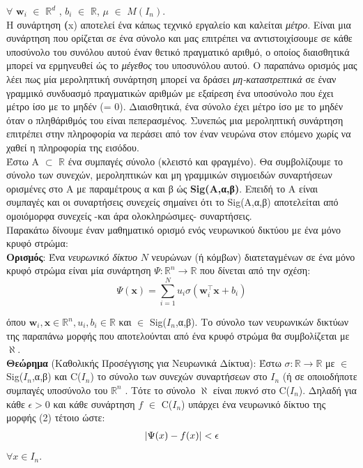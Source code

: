 \documentclass[11pt]{article} %
\numberwithin{equation}{subsection}
\begin{document}
$\forall$ $\textbf{w}_i$ $\in$   $\mathbb{R}^d$ , $b_i$ $\in$ $\mathbb{R}$, $\mu$ $\in$ $M(I_n)$.\\

Η συνάρτηση \mu \textbf(x) αποτελεί ένα κάπως τεχνικό εργαλείο και καλείται \textit{μέτρο}. Είναι μια συνάρτηση που ορίζεται σε ένα σύνολο και μας επιτρέπει να αντιστοιχίσουμε σε κάθε υποσύνολο του συνόλου αυτού έναν θετικό πραγματικό αριθμό, ο οποίος διαισθητικά μπορεί να ερμηνευθεί ώς το \textit{μέγεθος} του υποσυνόλου αυτού. Ο παραπάνω ορισμός μας λέει πως μία μεροληπτική συνάρτηση μπορεί να δράσει \textit{μη-καταστρεπτικά} σε έναν γραμμικό συνδυασμό πραγματικών αριθμών με εξαίρεση ένα υποσύνολο που έχει μέτρο ίσο με το μηδέν (\mu = 0). Διαισθητικά, ένα σύνολο έχει μέτρο ίσο με το μηδέν όταν ο πληθάριθμός του είναι πεπερασμένος. Συνεπώς μια μεροληπτική συνάρτηση επιτρέπει στην πληροφορία να περάσει από τον έναν νευρώνα στον επόμενο χωρίς να χαθεί η πληροφορία της εισόδου.\\

Έστω Α $\subset$ $\mathbb{R}$ ένα συμπαγές σύνολο (κλειστό και φραγμένο). Θα συμβολίζουμε το σύνολο των συνεχών, μεροληπτικών και μη γραμμικών σιγμοειδών συναρτήσεων ορισμένες στο Α με παραμέτρους α και β ώς \textbf{Sig(A,α,β)}. Επειδή το Α είναι συμπαγές και οι συναρτήσεις συνεχείς σημαίνει ότι το Sig(A,α,β) αποτελείται από ομοιόμορφα συνεχείς -και άρα ολοκληρώσιμες- συναρτήσεις. \\

Παρακάτω δίνουμε έναν μαθηματικό ορισμό ενός νευρωνικού δικτύου με ένα μόνο κρυφό στρώμα: \\

\textbf{Ορισμός}: Ένα \textit{νευρωνικό δίκτυο} $Ν$ νευρώνων (ή κόμβων) διατεταγμένων σε ένα μόνο κρυφό στρώμα είναι μία συνάρτηση $\Psi : \mathbb{R}^n \rightarrow \mathbb{R}$ που δίνεται από την σχέση:
\begin{equation}
 \displaystyle \Psi(\textbf{x}) = \sum_{i=1}^{N} u_i \sigma(\textbf{w}_i ^ \intercal \textbf{x} + b_i)
\end{equation}

όπου  $\textbf{w}_i,\textbf{x}  \in \mathbb{R}^n, u_i,b_i \in \mathbb{R}$ και \sigma $\in$ Sig($I_n$,α,β). Το σύνολο των νευρωνικών δικτύων της παραπάνω μορφής που αποτελούνται από ένα κρυφό στρώμα θα συμβολίζεται με $\aleph.$ \\

\textbf{Θεώρημα} (Καθολικής Προσέγγισης για Νευρωνικά Δίκτυα): Έστω $\sigma : \mathbb{R} \rightarrow \mathbb{R}$  με  \sigma  $\in$ Sig($I_n$,α,β) και C($I_n$) το σύνολο των συνεχών συναρτήσεων στο $Ι_n$ (ή σε οποιοδήποτε συμπαγές υποσύνολο του $\mathbb{R}^n$ . Τότε το σύνολο $\aleph$ είναι \textit{πυκνό} στο C($I_n$). Δηλαδή για κάθε $\epsilon > 0$ και κάθε συνάρτηση $f$ $\in$ C($I_n$) υπάρχει ένα νευρωνικό δίκτυο της μορφής (2) τέτοιο ώστε: \\
 \begin{align*}
\abs{\Psi(x) - f(x)} < \epsilon 
\end{align*}
$\forall x \in I_n$. \\
\end{document}
